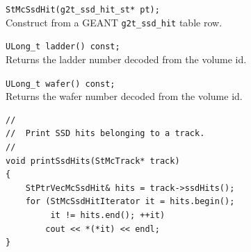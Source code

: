 \begin{Entry}
    \verb+StMcSsdHit(g2t_ssd_hit_st* pt);+\\
    Construct from a GEANT \texttt{g2t\_ssd\_hit} table row.

\item[Public Member\\ Functions]

    \verb+ULong_t ladder() const;+\\
    Returns the ladder number decoded from the volume id.

    \verb+ULong_t wafer() const;+\\
    Returns the wafer number decoded from the volume id.

\item[Examples]
{\footnotesize
\begin{verbatim}
//
//  Print SSD hits belonging to a track.
//
void printSsdHits(StMcTrack* track)
{
    StPtrVecMcSsdHit& hits = track->ssdHits();
    for (StMcSsdHitIterator it = hits.begin();
         it != hits.end(); ++it)
        cout << *(*it) << endl;
}
\end{verbatim}
}%
\end{Entry}
\clearpage

%
%

